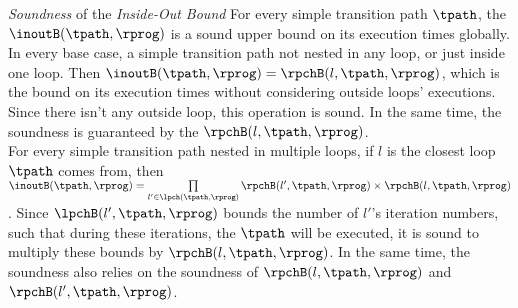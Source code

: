 \emph{Soundness} of the \emph{Inside-Out Bound}  
For every simple transition path $\tpath$, the $\inoutB(\tpath, \rprog)$
is a sound upper bound on its execution times globally.
\\
In every base case, a simple transition path not nested in any loop, or just inside one loop.
Then $\inoutB(\tpath, \rprog) = \rpchB(l, \tpath, \rprog)$, which is the bound on its execution times without considering
outside loops' executions. Since there isn't any outside loop, this operation is sound.
In the same time, the soundness is guaranteed by the $\rpchB(l, \tpath, \rprog)$.
\\
For every simple transition path nested in multiple loops, if $l$ is the closest loop $\tpath$ comes from, then
$\inoutB(\tpath, \rprog) =
\prod\limits_{l' \in \lpch(\tpath, \rprog)} \rpchB(l', \tpath, \rprog) \times \rpchB(l, \tpath, \rprog)$.
Since $\lpchB(l', \tpath, \rprog)$ bounds the number of $l'$'s iteration numbers,
such that during these iterations, the $\tpath$ will be executed,
it is sound to multiply these bounds by $\rpchB(l, \tpath, \rprog)$.
In the same time, the soundness also relies on the soundness of $\rpchB(l, \tpath, \rprog)$ and $\rpchB(l', \tpath, \rprog)$. 
